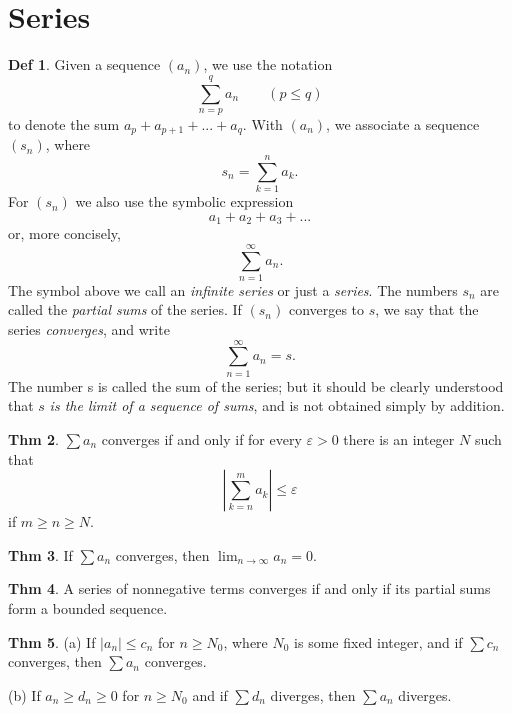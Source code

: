 \documentclass{article}
\theoremstyle{definition}
\newtheorem{definition}{Def}
\newtheorem{theorem}[definition]{Thm}
\begin{document}
\section{Series}
\begin{definition}
    Given a sequence $(a_n)$, we use the notation
    \[
    \sum_{n=p}^q a_n\qquad (p\leq q)
    \]
    to denote the sum $a_p+a_{p+1}+...+a_q$. With $(a_n)$, we associate a sequence $(s_n)$, where
    \[
    s_n=\sum_{k=1}^n a_k.
    \]
    For $(s_n)$ we also use the symbolic expression
    \[
    a_1+a_2+a_3+...
    \]
    or, more concisely,
    \[
    \sum_{n=1}^\infty a_n.
    \]
    The symbol above we call an \textit{infinite series} or just a \textit{series}. The numbers $s_n$ are called the \textit{partial sums} of the series. If $(s_n)$ converges to $s$, we say that the series \textit{converges}, and write
    \[
    \sum_{n=1}^\infty a_n=s.
    \]
    The number s is called the sum of the series; but it should be clearly understood that $s$ \textit{is the limit of a sequence of sums}, and is not obtained simply by addition.
\end{definition}
\begin{theorem}
    $\sum a_n$ converges if and only if for every $\varepsilon>0$ there is an integer $N$ such that
    \[
    |\sum_{k=n}^m a_k|\leq \varepsilon
    \]
    if $m\geq n\geq N$.
\end{theorem}
\begin{theorem}
    If $\sum a_n$ converges, then $\lim_{n\to\infty}a_n=0$.
\end{theorem}
\begin{theorem}
    A series of nonnegative terms converges if and only if its partial sums form a bounded sequence.
\end{theorem}
\begin{theorem}
    \leavevmode\par
    (a) If $|a_n|\leq c_n$ for $n\geq N_0$, where $N_0$ is some fixed integer, and if $\sum c_n$ converges, then $\sum a_n$ converges.\par
    (b) If $a_n\geq d_n\geq 0$ for $n\geq N_0$ and if $\sum d_n$ diverges, then $\sum a_n$ diverges.
\end{theorem}
\end{document}

